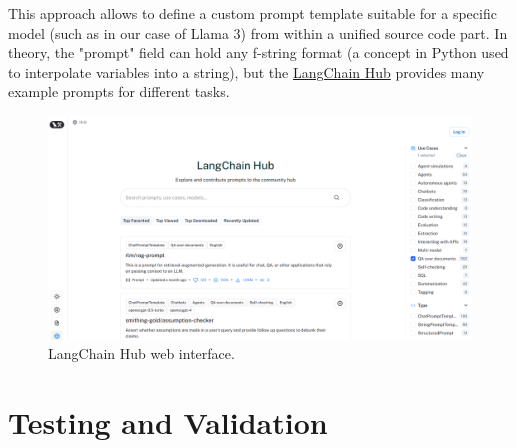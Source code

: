This approach allows to define a custom prompt template suitable for a specific model (such as in our case of Llama 3) from within a unified source code part. In theory, the "prompt" field can hold any f-string format (a concept in Python used to interpolate variables into a string), but the \href{https://smith.langchain.com/hub}{LangChain Hub} provides many example prompts for different tasks.
\begin{figure}[htbp]
    \centering
    \includegraphics[width=\linewidth]{./figures/langchain-hub.png}
    \caption{LangChain Hub web interface.}
\end{figure}\newline
\newpage

\section{Testing and Validation}
